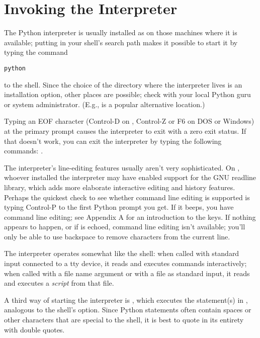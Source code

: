 \documentclass{manual}
\begin{document}
\section{Invoking the Interpreter}
\label{invoking}

The Python interpreter is usually installed as 
on those machines where it is available; putting  in
your \UNIX{} shell's search path makes it possible to start it by
typing the command

\begin{verbatim}
python
\end{verbatim}

to the shell.  Since the choice of the directory where the interpreter
lives is an installation option, other places are possible; check with
your local Python guru or system administrator.  (E.g.,
 is a popular alternative location.)

Typing an EOF character (Control-D on \UNIX{}, Control-Z or F6 on DOS
or Windows) at the primary prompt causes the interpreter to exit with
a zero exit status.  If that doesn't work, you can exit the
interpreter by typing the following commands: .

The interpreter's line-editing features usually aren't very
sophisticated.  On \UNIX{}, whoever installed the interpreter may have
enabled support for the GNU readline library, which adds more
elaborate interactive editing and history features. Perhaps the
quickest check to see whether command line editing is supported is
typing Control-P to the first Python prompt you get.  If it beeps, you
have command line editing; see Appendix A for an introduction to the
keys.  If nothing appears to happen, or if  is echoed,
command line editing isn't available; you'll only be able to use
backspace to remove characters from the current line.

The interpreter operates somewhat like the \UNIX{} shell: when called
with standard input connected to a tty device, it reads and executes
commands interactively; when called with a file name argument or with
a file as standard input, it reads and executes a \emph{script} from
that file. 

A third way of starting the interpreter is
, which
executes the statement(s) in , analogous to the shell's
 option.  Since Python statements often contain spaces or other
characters that are special to the shell, it is best to quote
 in its entirety with double quotes.
\end{document}
